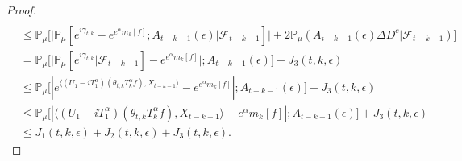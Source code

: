 \documentclass[12pt]{amsart}
\theoremstyle{plain}
\theoremstyle{definition}
\numberwithin{equation}{section}
\begin{document}
\begin{proof}
\begin{align}
    \\& \leq \mathbb{P}_{\mu}\Big[\big| \mathbb{P}_{\mu}[e^{i\gamma_{t,k}}-e^{e^{\alpha}m_k[f]}; A_{t-k-1}(\epsilon)| \mathscr F_{t-k-1}]\big| + 2\mathbb P_\mu(A_{t-k-1}(\epsilon) \Delta D^c| \mathscr F_{t-k-1})\Big]
    \\& = \mathbb{P}_{\mu}\Big[ \big|\mathbb{P}_{\mu}[e^{i\gamma_{t,k}}| \mathscr F_{t-k-1}]-e^{e^{\alpha}m_k[f]}\big|;A_{t-k-1}(\epsilon)\Big] + J_3(t,k,\epsilon)
    \\& \leq \mathbb{P}_{\mu}\big[|e^{\langle (U_1 - iT_{1}^{\alpha}) (\theta_{t,k}T_k^{\alpha}f),X_{t-k-1}\rangle}-e^{e^{\alpha}m_k[f]}|;A_{t-k-1}(\epsilon)\big]+  J_3(t,k,\epsilon)
    \\& \leq \mathbb{P}_{\mu}\big[|\langle (U_1 - i T_1^\alpha)(\theta_{t,k}T_k^{\alpha}f),X_{t-k-1}\rangle-e^{\alpha}m_k[f]|;A_{t-k-1}(\epsilon)\big]+  J_3(t,k,\epsilon)
    \\&\leq J_1(t,k,\epsilon) + J_2(t,k,\epsilon)+J_3(t,k,\epsilon).
\end{align}


\end{proof}
\end{document}
